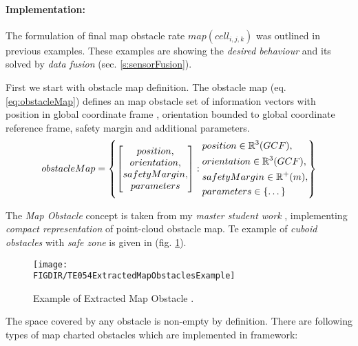 \paragraph{Implementation:} The formulation of final map obstacle rate  $map(cell_{i,j,k})$ was outlined in previous examples. These examples are showing the \emph{desired behaviour} and its solved by \emph{data fusion} (sec. \ref{s:sensorFusion}).

First we start with obstacle map definition. The obstacle map  (eq. \ref{eq:obstacleMap}) defines an map obstacle set of information vectors with position in global coordinate frame , orientation bounded to global coordinate reference frame, safety margin and additional parameters.
\begin{equation}\label{eq:obstacleMap}
    obstacle Map= 
    \left\{
    \begin{bmatrix}
        position,\\
        orientation,\\
        safety Margin,\\
        parameters
    \end{bmatrix}
    :
    \begin{aligned}
        & position \in  \mathbb{R}^3(GCF),\\
        & orientation \in \mathbb{R}^3(GCF),\\
        & safety Margin \in \mathbb{R}^+(m),\\
        & parameters \in \{\dots\}
    \end{aligned}
    \right\}
\end{equation}


The \emph{Map Obstacle} concept is taken from my \emph{master student work} \cite{cernamaria2018}, implementing \emph{compact representation} of point-cloud obstacle map. Te example of \emph{cuboid obstacles} with \emph{safe zone} is given in (fig. \ref{fig:exampleExtractedMapObstacles}).
    
\begin{figure}[H]
    \centering
    \texttt{[image: \\FIGDIR/TE054ExtractedMapObstaclesExample]}
    \caption{Example of Extracted Map Obstacle \cite{cernamaria2018}.}
    \label{fig:exampleExtractedMapObstacles}
\end{figure} 

\noindent The space covered by any obstacle  is non-empty by definition. There are following types of map charted obstacles which are implemented in framework:

